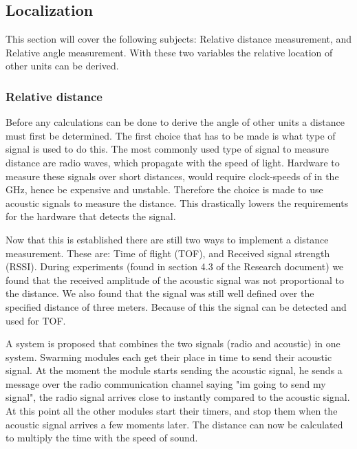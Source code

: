 \documentclass[10pt,a4paper]{article}
\begin{document}
\subsection{Localization}
This section will cover the following subjects: Relative distance measurement, and Relative angle measurement. With these two variables the relative location of other units can be derived. 

\subsubsection{Relative distance}
Before any calculations can be done to derive the angle of other units a distance must first be determined. The first choice that has to be made is what type of signal is used to do this. The most commonly used type of signal to measure distance are radio waves, which propagate with the speed of light. Hardware to measure these  signals over short distances, would require clock-speeds of in the GHz, hence be expensive and unstable. Therefore the choice is made to use acoustic signals to measure the distance. This drastically lowers the requirements for the hardware that detects the signal.

Now that this is established there are still two ways to implement a distance measurement. These are: Time of flight (TOF), and Received signal strength (RSSI). During experiments (found in section 4.3 of the Research document) we found that the received amplitude of the acoustic signal was not proportional to the distance. We also found that the signal was still well defined over the specified distance of three meters. Because of this the signal can be detected and used for TOF.

A system is proposed that combines the two signals (radio and acoustic) in one system. Swarming modules each get their place in time to send their acoustic signal. At the moment the module starts sending the acoustic signal, he sends a message over the radio communication channel saying "im going to send my signal", the radio signal arrives close to instantly compared to the acoustic signal. At this point all the other modules start their timers, and stop them when the acoustic signal arrives a few moments later. The distance can now be calculated to multiply the time with the speed of sound.
\end{document}
